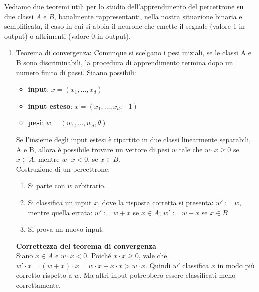 Vediamo due teoremi utili per lo studio dell'apprendimento del percettrone su due classi $A$ e $B$, banalmente rappresentanti, nella nostra situazione binaria e semplificata, il caso in cui si abbia il neurone che emette il segnale (valore 1 in output) o altrimenti (valore 0 in output). 
\begin{enumerate}
    \item Teorema di convergenza: Comunque si scelgano i pesi iniziali, se le classi A e B sono discriminabili, la procedura di apprendimento termina dopo un numero finito di passi.
    Siaano possibili:
    \begin{itemize}
        \item \textbf{input}: $x = (x_1, \dots, x_d)$
        \item \textbf{input esteso}: $x = (x_1, \dots, x_d, -1)$
        \item \textbf{pesi}: $w = (w_1, \dots, w_d, \theta)$
    \end{itemize}
    Se l’insieme degli input estesi è ripartito in due classi linearmente separabili, A e B, allora è possibile trovare un vettore di pesi $w$ tale che $w \cdot x \geq 0$ se $x \in A$; mentre $w \cdot x < 0$, se $x \in B$. \\
    Costruzione di un percettrone:
    \begin{enumerate}
        \item  Si parte con $w$ arbitrario.
        \item Si classifica un input $x$, dove la risposta corretta si presenta: $w' := w$, mentre quella errata: $w' := w+x$ se $x\in A$; 	$w' := w-x$ se $x \in B$
        \item Si prova un nuovo input.
    \end{enumerate}
    \textbf{Correttezza del teorema di convergenza}\\
    Siano $x \in A$ e $w \cdot x <0$. Poiché $x \cdot x \geq 0$, vale che $w' \cdot x = (w+x) \cdot x = w \cdot x + x \cdot x > w \cdot x$. Quindi $w'$ classifica $x$ in modo più corretto rispetto a $w$. Ma altri input potrebbero essere classificati meno correttamente.\\


\end{enumerate}
